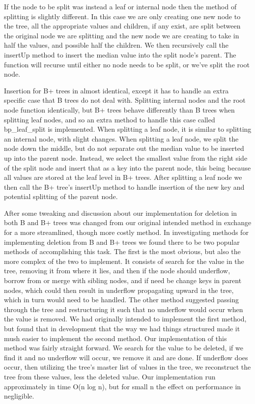     If the node to be split was instead a leaf or internal node then the method of splitting is slightly different.  In this case we are only creating one new node to the tree, all the appropriate values and children, if any exist, are split between the original node we are splitting and the new node we are creating to take in half the values, and possible half the children.  We then recursively call the insertUp method to insert the median value into the split node's parent.  The function will recurse until either no node needs to be split, or we've split the root node.
    
    Insertion for B+ trees in almost identical, except it has to handle an extra specific case that B trees do not deal with.  Splitting internal nodes and the root node function identically, but B+ trees behave differently than B trees when splitting leaf nodes, and so an extra method to handle this case called bp\_leaf\_split is implemented.  When splitting a leaf node, it is similar to splitting an internal node, with slight changes.  When splitting a leaf node, we split the node down the middle, but do not separate out the median value to be inserted up into the parent node.  Instead, we select the smallest value from the right side of the split node and insert that as a key into the parent node, this being because all values are stored at the leaf level in B+ trees.  After splitting a leaf node we then call the B+ tree's insertUp method to handle insertion of the new key and potential splitting of the parent node.
    
    After some tweaking and discussion about our implementation for deletion in both B and B+ trees was changed from our original intended method in exchange for a more streamlined, though more costly method.  In investigating methods for implementing deletion from B and B+ trees we found there to be two popular methods of accomplishing this task.  The first is the most obvious, but also the more complex of the two to implement.  It consists of search for the value in the tree, removing it from where it lies, and then if the node should underflow, borrow from or merge with sibling nodes, and if need be change keys in parent nodes, which could then result in underflow propagating upward in the tree, which in turn would need to be handled.  The other method suggested passing through the tree and restructuring it such that no underflow would occur when the value is removed.  We had originally intended to implement the first method, but found that in development that the way we had things structured made it mush easier to implement the second method.  Our implementation of this method was fairly straight forward.  We search for the value to be deleted, if we find it and no underflow will occur, we remove it and are done.  If underflow does occur, then utilizing the tree's master list of values in the tree, we reconstruct the tree from these values, less the deleted value.  Our implementation run approximately in time O(n log n), but for small n the effect on performance in negligible.

